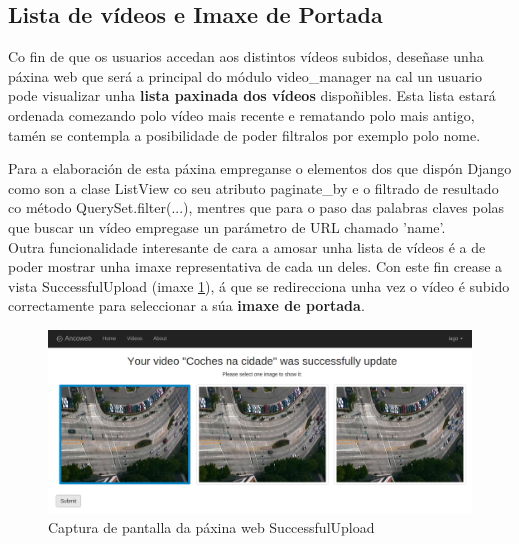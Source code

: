     \subsection{Lista de vídeos e Imaxe de Portada}
        
        Co fin de que os usuarios accedan aos distintos vídeos subidos, deseñase unha páxina web que será a
        principal do módulo video\_manager na cal un usuario pode visualizar unha \textbf{ lista paxinada dos
        vídeos} dispoñibles. Esta lista estará ordenada comezando polo vídeo mais recente e rematando
        polo mais antigo, tamén se contempla a posibilidade de poder filtralos por exemplo polo nome.
        
        Para a elaboración de esta páxina empreganse o elementos dos que dispón Django como son a
        clase ListView co seu atributo paginate\_by e o filtrado de resultado co método 
        QuerySet.filter(...), mentres que para o paso das palabras claves polas que buscar un vídeo
        empregase un parámetro de URL chamado 'name'.\\
        
        Outra funcionalidade interesante de cara a amosar unha lista de vídeos é a de poder mostrar unha
        imaxe representativa de cada un deles. Con este fin crease a vista SuccessfulUpload (imaxe
        \ref{fig:SuccessfulUploadScreen}), á que se redirecciona unha vez o vídeo é subido correctamente
        para seleccionar a súa \textbf{imaxe de portada}.
        
        \begin{figure}[htp]
        \begin{center}
            \includegraphics[scale=0.35]{figures/SuccessfulUploadScreen.png}
            \caption{Captura de pantalla da páxina web SuccessfulUpload}
        \label{fig:SuccessfulUploadScreen}
        \end{center}
        \end{figure}
        
